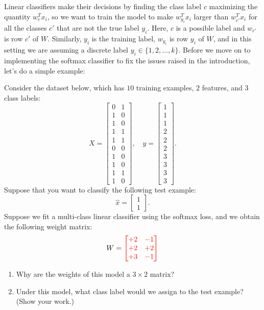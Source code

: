 \documentclass{article}
\def\blu#1{{\color{blu}#1}}
\def\red#1{{\color{red}#1}}
\def\enum#1{\begin{enumerate}#1\end{enumerate}}
\begin{document}
Linear classifiers make their decisions by finding the class label $c$ maximizing the quantity $w_c^Tx_i$, so we want to train the model to make $w_{y_i}^Tx_i$ larger than $w_{c'}^Tx_i$ for all the classes $c'$ that are not the true label $y_i$. 
Here, $c$ is a possible label and $w_{c'}$ is \red{row} $c'$ of $W$. Similarly, $y_i$ is the training label, $w_{y_i}$ is \red{row} $y_i$ of $W$, and in this setting we are assuming a discrete label $y_i \in \{1,2,\dots,k\}$. Before we move on to implementing the softmax classifier to fix the issues raised in the introduction, let's do a simple example:

Consider the dataset below, which has $10$ training examples, $2$ features, and $3$ class labels:
\[
X = \begin{bmatrix}0 & 1\\1 & 0\\ 1 & 0\\ 1 & 1\\ 1 & 1\\ 0 & 0\\  1 & 0\\  1 & 0\\  1 & 1\\  1 &0\end{bmatrix}, \quad y = \begin{bmatrix}1\\1\\1\\2\\2\\2\\3\\3\\3\\3\end{bmatrix}.
\]
Suppose that you want to classify the following test example:
\[
\hat{x} = \begin{bmatrix}1 \\ 1\end{bmatrix}.
\]
Suppose we fit a multi-class linear classifier using the softmax loss, and we obtain the following weight matrix:
\[
W = 
\red{\begin{bmatrix}
+2 & -1\\
+2 & +2\\
+3 & -1\\
\end{bmatrix}}
\]
\blu{
\enum{
\item Why are the weights of this model a \red{$3 \times 2$} matrix?
\item Under this model, what class label would we assign to the test example? (Show your work.)
}}
\end{document}
